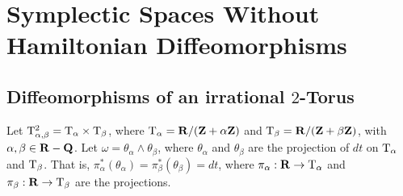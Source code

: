 \chapter*{\sf Symplectic Spaces Without \\ Hamiltonian Diffeomorphisms}

\newcommand{\bargamma}{\raisebox{-2.5pt}{--}\hspace{-6pt}\gamma}

\setcounter{footnote}{0}



\begin{abstract}
  We consider the $2$-dimensional irrational torus $\Torus^2_{\alpha,\beta} = \Torus_\alpha \times \Torus_\beta$,
  where $\Torus_\alpha = \RR/(\ZZ+\alpha\ZZ)$ and $\Torus_\beta = \RR/(\ZZ+\beta\ZZ$),
  with $\alpha,\beta \in \RR-\QQ$.
  We check that $2$-form $\omega = \theta_\alpha \wedge \theta_\beta$,
  where $\theta_\alpha$ and $\theta_\beta$ are the projection of $dt$ on $\Torus_\alpha$ and $\Torus_\beta$,
  is symplectic,
  according to the definition of a symplectic form in diffeology.
  Then,
  we show that the group of symplectic transformations $\Diff(\Torus^2_{\alpha,\beta},\omega)$ has no Hamiltonian transformation.
\end{abstract}


\section{Diffeomorphisms of an irrational $2$-Torus}

Let  $\Torus^2_{\alpha,\beta} = \Torus_\alpha \times \Torus_\beta$,
where $\Torus_\alpha = \RR/(\ZZ+\alpha\ZZ)$ and $\mathrm{T}_\beta = \mathbf{R}/(\mathbf{Z}+\beta\mathbf{Z})$,
with $\alpha,\beta \in \RR-\QQ$.
Let $\omega = \theta_\alpha \wedge \theta_\beta$,
where $\theta_\alpha$ and $\theta_\beta$ are the projection of $dt$ on $\Torus_\alpha$ and $\Torus_\beta$.
That is,
$\pi_\alpha^*(\theta_\alpha) = \pi_\beta^*(\theta_\beta)=dt$,
where $\pi_\alpha:\mathbf{R} \to \mathrm{T}_\alpha$ and $\pi_\beta:\mathbf{R} \to \mathrm{T}_\beta$ are the projections.

